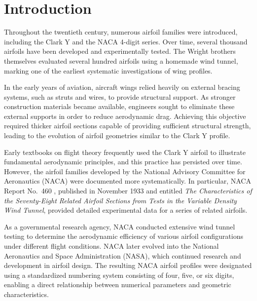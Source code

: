 \section*{Introduction}

Throughout the twentieth century, 
numerous airfoil families were introduced, including the Clark Y and the NACA 4-digit series. 
Over time, several thousand airfoils have been developed and experimentally tested. 
The Wright brothers themselves evaluated several hundred airfoils using a homemade wind tunnel, 
marking one of the earliest systematic investigations of wing profiles.

In the early years of aviation, 
aircraft wings relied heavily on external bracing systems, 
such as struts and wires, to provide structural support. 
As stronger construction materials became available, 
engineers sought to eliminate these external supports in order to reduce aerodynamic drag. 
Achieving this objective required thicker airfoil sections capable of providing sufficient structural strength, 
leading to the evolution of airfoil geometries similar to the Clark Y profile.

Early textbooks on flight theory frequently used the Clark Y airfoil to illustrate fundamental aerodynamic principles, and this practice has persisted over time. 
However, the airfoil families developed by the National Advisory Committee for Aeronautics (NACA) were documented more systematically. 
In particular, NACA Report No.~460 \cite{NACA_TR_460}, 
published in November 1933 and entitled \textit{The Characteristics of the Seventy-Eight Related Airfoil Sections from Tests in the Variable Density Wind Tunnel}, 
provided detailed experimental data for a series of related airfoils.

As a governmental research agency, 
NACA conducted extensive wind tunnel testing to determine the aerodynamic efficiency of various airfoil configurations under different flight conditions. 
NACA later evolved into the National Aeronautics and Space Administration (NASA), which continued research and development in airfoil design. 
The resulting NACA airfoil profiles were designated using a standardized numbering system 
consisting of four, five, or six digits, enabling a direct relationship between numerical parameters and geometric characteristics.